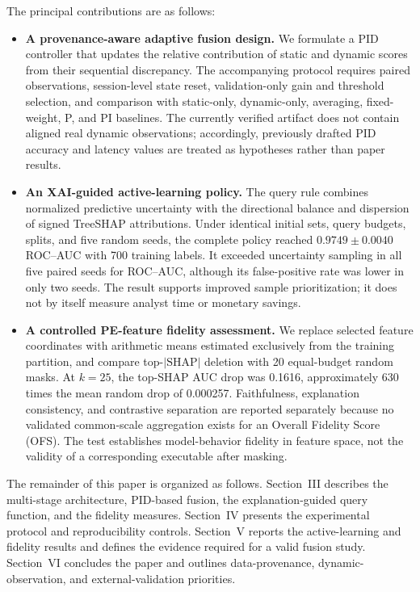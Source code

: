 \documentclass{IEEEtran}
\begin{document}
The principal contributions are as follows:

\begin{itemize}
    \item \textbf{A provenance-aware adaptive fusion design.} We formulate a PID controller that updates the relative contribution of static and dynamic scores from their sequential discrepancy. The accompanying protocol requires paired observations, session-level state reset, validation-only gain and threshold selection, and comparison with static-only, dynamic-only, averaging, fixed-weight, P, and PI baselines. The currently verified artifact does not contain aligned real dynamic observations; accordingly, previously drafted PID accuracy and latency values are treated as hypotheses rather than paper results.

    \item \textbf{An XAI-guided active-learning policy.} The query rule combines normalized predictive uncertainty with the directional balance and dispersion of signed TreeSHAP attributions. Under identical initial sets, query budgets, splits, and five random seeds, the complete policy reached $0.9749\pm0.0040$ ROC--AUC with 700 training labels. It exceeded uncertainty sampling in all five paired seeds for ROC--AUC, although its false-positive rate was lower in only two seeds. The result supports improved sample prioritization; it does not by itself measure analyst time or monetary savings.

    \item \textbf{A controlled PE-feature fidelity assessment.} We replace selected feature coordinates with arithmetic means estimated exclusively from the training partition, and compare top-$|\mathrm{SHAP}|$ deletion with 20 equal-budget random masks. At $k=25$, the top-SHAP AUC drop was 0.1616, approximately 630 times the mean random drop of 0.000257. Faithfulness, explanation consistency, and contrastive separation are reported separately because no validated common-scale aggregation exists for an Overall Fidelity Score (OFS). The test establishes model-behavior fidelity in feature space, not the validity of a corresponding executable after masking.
\end{itemize}

The remainder of this paper is organized as follows. Section~III describes the multi-stage architecture, PID-based fusion, the explanation-guided query function, and the fidelity measures. Section~IV presents the experimental protocol and reproducibility controls. Section~V reports the active-learning and fidelity results and defines the evidence required for a valid fusion study. Section~VI concludes the paper and outlines data-provenance, dynamic-observation, and external-validation priorities.
\end{document}
